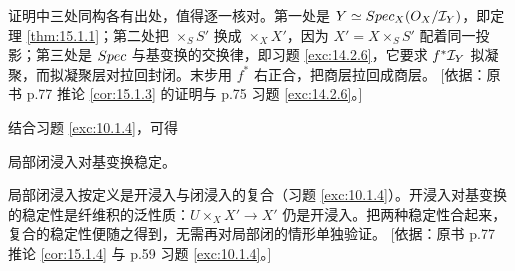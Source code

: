 \begin{yizhu}
证明中三处同构各有出处，值得逐一核对。第一处是 $Y \simeq Spec_X(O_X/\mathcal{I}_Y)$，即定理 \ref{thm:15.1.1}；第二处把 $\times_S S'$ 换成 $\times_X X'$，因为 $X' = X \times_S S'$ 配着同一投影；第三处是 $Spec$ 与基变换的交换律，即习题 \ref{exc:14.2.6}，它要求 $f^*\mathcal{I}_Y$ 拟凝聚，而拟凝聚层对拉回封闭。末步用 $f^*$ 右正合，把商层拉回成商层。
[依据：原书 p.77 推论 \ref{cor:15.1.3} 的证明与 p.75 习题 \ref{exc:14.2.6}。]
\end{yizhu}

结合习题 \ref{exc:10.1.4}，可得

\begin{corollary}\label{cor:15.1.4}
局部闭浸入对基变换稳定。
\end{corollary}

\begin{yizhu}
局部闭浸入按定义是开浸入与闭浸入的复合（习题 \ref{exc:10.1.4}）。开浸入对基变换的稳定性是纤维积的泛性质：$U \times_X X' \to X'$ 仍是开浸入。把两种稳定性合起来，复合的稳定性便随之得到，无需再对局部闭的情形单独验证。
[依据：原书 p.77 推论 \ref{cor:15.1.4} 与 p.59 习题 \ref{exc:10.1.4}。]
\end{yizhu}
